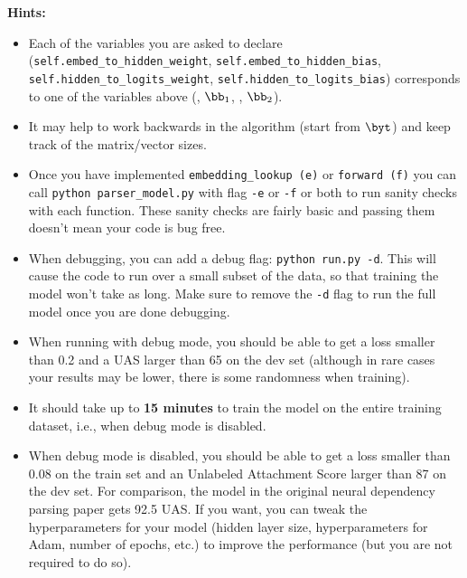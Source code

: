 \begin{parts}
\begin{enumerate}[label=\roman*.]
              \textbf{Hints:}
              \begin{itemize}
                  \item Each of the variables you are asked to declare (\texttt{self.embed\_to\_hidden\_weight}, \newline \texttt{self.embed\_to\_hidden\_bias}, \texttt{self.hidden\_to\_logits\_weight}, \newline \texttt{self.hidden\_to\_logits\_bias}) corresponds to one of the variables above (\bW, $\bb_1$, \bU, $\bb_2$).
                  \item It may help to work backwards in the algorithm (start from $\byt$) and keep track of the matrix/vector sizes.
                  \item Once you have implemented \texttt{embedding\_lookup (e)} or \texttt{forward (f)} you can call \texttt{python parser\_model.py} with flag \texttt{-e} or \texttt{-f} or both to run sanity checks with each function. These sanity checks are fairly basic and passing them doesn't mean your code is bug free.
                  \item
                        When debugging, you can add a debug flag: \texttt{python run.py -d}. This will cause the code to run over a small subset of the data, so that training the model won't take as long. Make sure to remove the \texttt{-d} flag to run the full model once you are done debugging.

                  \item
                        When running with debug mode, you should be able to get a loss smaller than 0.2 and a UAS larger than 65 on the dev set (although in rare cases your results may be lower, there is some randomness when training).

                  \item It should take up to \textbf{15 minutes} to train the model on the entire training dataset, i.e., when debug mode is disabled.

                  \item When debug mode is disabled, you should be able to get a loss smaller than 0.08 on the train set and an Unlabeled Attachment Score larger than 87 on the dev set. For comparison, the model in the original neural dependency parsing paper gets 92.5 UAS. If you want, you can tweak the hyperparameters for your model (hidden layer size, hyperparameters for Adam, number of epochs, etc.) to improve the performance (but you are not required to do so).
              \end{itemize}


\end{enumerate}
\end{parts}
